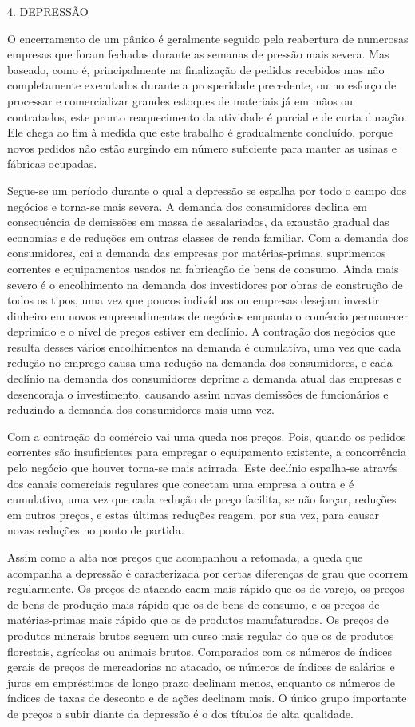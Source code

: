 \documentclass[12pt]{article}
\begin{document}
4. DEPRESSÃO

O encerramento de um pânico é geralmente seguido pela reabertura de numerosas empresas que foram fechadas durante as semanas de pressão mais severa. Mas baseado, como é, principalmente na finalização de pedidos recebidos mas não completamente executados durante a prosperidade precedente, ou no esforço de processar e comercializar grandes estoques de materiais já em mãos ou contratados, este pronto reaquecimento da atividade é parcial e de curta duração. Ele chega ao fim à medida que este trabalho é gradualmente concluído, porque novos pedidos não estão surgindo em número suficiente para manter as usinas e fábricas ocupadas.

Segue-se um período durante o qual a depressão se espalha por todo o campo dos negócios e torna-se mais severa. A demanda dos consumidores declina em consequência de demissões em massa de assalariados, da exaustão gradual das economias e de reduções em outras classes de renda familiar. Com a demanda dos consumidores, cai a demanda das empresas por matérias-primas, suprimentos correntes e equipamentos usados na fabricação de bens de consumo. Ainda mais severo é o encolhimento na demanda dos investidores por obras de construção de todos os tipos, uma vez que poucos indivíduos ou empresas desejam investir dinheiro em novos empreendimentos de negócios enquanto o comércio permanecer deprimido e o nível de preços estiver em declínio. A contração dos negócios que resulta desses vários encolhimentos na demanda é cumulativa, uma vez que cada redução no emprego causa uma redução na demanda dos consumidores, e cada declínio na demanda dos consumidores deprime a demanda atual das empresas e desencoraja o investimento, causando assim novas demissões de funcionários e reduzindo a demanda dos consumidores mais uma vez.

Com a contração do comércio vai uma queda nos preços. Pois, quando os pedidos correntes são insuficientes para empregar o equipamento existente, a concorrência pelo negócio que houver torna-se mais acirrada. Este declínio espalha-se através dos canais comerciais regulares que conectam uma empresa a outra e é cumulativo, uma vez que cada redução de preço facilita, se não forçar, reduções em outros preços, e estas últimas reduções reagem, por sua vez, para causar novas reduções no ponto de partida.

Assim como a alta nos preços que acompanhou a retomada, a queda que acompanha a depressão é caracterizada por certas diferenças de grau que ocorrem regularmente. Os preços de atacado caem mais rápido que os de varejo, os preços de bens de produção mais rápido que os de bens de consumo, e os preços de matérias-primas mais rápido que os de produtos manufaturados. Os preços de produtos minerais brutos seguem um curso mais regular do que os de produtos florestais, agrícolas ou animais brutos. Comparados com os números de índices gerais de preços de mercadorias no atacado, os números de índices de salários e juros em empréstimos de longo prazo declinam menos, enquanto os números de índices de taxas de desconto e de ações declinam mais. O único grupo importante de preços a subir diante da depressão é o dos títulos de alta qualidade.
\end{document}
